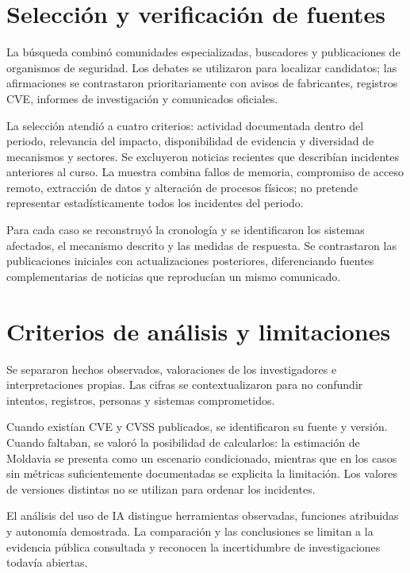 \section{Selección y verificación de fuentes}
La búsqueda combinó comunidades especializadas,
buscadores y publicaciones de organismos de seguridad.
Los debates se utilizaron para localizar candidatos;
las afirmaciones se contrastaron prioritariamente
con avisos de fabricantes, registros CVE, informes
de investigación y comunicados oficiales.

La selección atendió a cuatro criterios: actividad
documentada dentro del periodo, relevancia del impacto,
disponibilidad de evidencia y diversidad de mecanismos
y sectores. Se excluyeron noticias recientes que
describían incidentes anteriores al curso.
La muestra combina fallos de memoria, compromiso
de acceso remoto, extracción de datos y alteración
de procesos físicos; no pretende representar
estadísticamente todos los incidentes del periodo.

Para cada caso se reconstruyó la cronología y se
identificaron los sistemas afectados, el mecanismo
descrito y las medidas de respuesta.
Se contrastaron las publicaciones iniciales con
actualizaciones posteriores, diferenciando fuentes
complementarias de noticias que reproducían
un mismo comunicado.

\section{Criterios de análisis y limitaciones}
Se separaron hechos observados, valoraciones
de los investigadores e interpretaciones propias.
Las cifras se contextualizaron para no confundir
intentos, registros, personas y sistemas comprometidos.

Cuando existían CVE y CVSS publicados, se identificaron
su fuente y versión. Cuando faltaban, se valoró
la posibilidad de calcularlos: la estimación
de Moldavia se presenta como un escenario condicionado,
mientras que en los casos sin métricas suficientemente
documentadas se explicita la limitación.
Los valores de versiones distintas no se utilizan
para ordenar los incidentes.

El análisis del uso de IA distingue herramientas
observadas, funciones atribuidas y autonomía demostrada.
La comparación y las conclusiones se limitan
a la evidencia pública consultada y reconocen
la incertidumbre de investigaciones todavía abiertas.